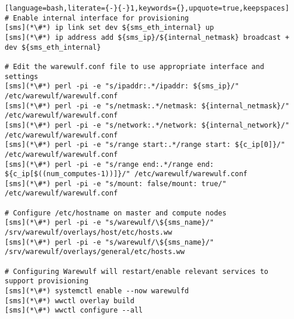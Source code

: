 \begin{lstlisting}[language=bash,literate={-}{-}1,keywords={},upquote=true,keepspaces]
# Enable internal interface for provisioning
[sms](*\#*) ip link set dev ${sms_eth_internal} up
[sms](*\#*) ip address add ${sms_ip}/${internal_netmask} broadcast + dev ${sms_eth_internal}

# Edit the warewulf.conf file to use appropriate interface and settings
[sms](*\#*) perl -pi -e "s/ipaddr:.*/ipaddr: ${sms_ip}/" /etc/warewulf/warewulf.conf
[sms](*\#*) perl -pi -e "s/netmask:.*/netmask: ${internal_netmask}/" /etc/warewulf/warewulf.conf
[sms](*\#*) perl -pi -e "s/network:.*/network: ${internal_network}/" /etc/warewulf/warewulf.conf
[sms](*\#*) perl -pi -e "s/range start:.*/range start: ${c_ip[0]}/" /etc/warewulf/warewulf.conf
[sms](*\#*) perl -pi -e "s/range end:.*/range end: ${c_ip[$((num_computes-1))]}/" /etc/warewulf/warewulf.conf
[sms](*\#*) perl -pi -e "s/mount: false/mount: true/" /etc/warewulf/warewulf.conf

# Configure /etc/hostname on master and compute nodes
[sms](*\#*) perl -pi -e "s/warewulf/\${sms_name}/" /srv/warewulf/overlays/host/etc/hosts.ww
[sms](*\#*) perl -pi -e "s/warewulf/\${sms_name}/" /srv/warewulf/overlays/general/etc/hosts.ww

# Configuring Warewulf will restart/enable relevant services to support provisioning
[sms](*\#*) systemctl enable --now warewulfd
[sms](*\#*) wwctl overlay build
[sms](*\#*) wwctl configure --all
\end{lstlisting}
